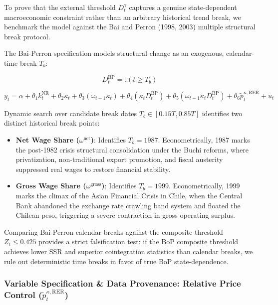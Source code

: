 To prove that the external threshold $D_t^{\gamma}$ captures a genuine state-dependent macroeconomic constraint rather than an arbitrary historical trend break, we benchmark the model against the Bai and Perron (1998, 2003) multiple structural break protocol.

The Bai-Perron specification models structural change as an exogenous, calendar-time break $T_b$:

\begin{equation}
D_t^{\text{BP}} = \mathbb{I}(t \ge T_b)
\end{equation}

\begin{equation}
y_t = \alpha + \theta_1 k_t^{\text{NR}} + \theta_2 \kappa_t + \theta_3 (\omega_{t-1} \kappa_t) + \theta_4 (\kappa_t D_t^{\text{BP}}) + \theta_5 (\omega_{t-1} \kappa_t D_t^{\text{BP}}) + \theta_6 \tilde{p}_t^{\kappa, \text{RER}} + u_t
\end{equation}

Dynamic search over candidate break dates $T_b \in [0.15 T, 0.85 T]$ identifies two distinct historical break points:
\begin{itemize}
    \item \textbf{Net Wage Share ($\omega^{\text{net}}$)}: Identifies $T_b = 1987$. Econometrically, 1987 marks the post-1982 crisis structural consolidation under the Buchi reforms, where privatization, non-traditional export promotion, and fiscal austerity suppressed real wages to restore financial stability.
    \item \textbf{Gross Wage Share ($\omega^{\text{gross}}$)}: Identifies $T_b = 1999$. Econometrically, 1999 marks the climax of the Asian Financial Crisis in Chile, when the Central Bank abandoned the exchange rate crawling band system and floated the Chilean peso, triggering a severe contraction in gross operating surplus.
\end{itemize}

Comparing Bai-Perron calendar breaks against the composite threshold $Z_t \le 0.425$ provides a strict falsification test: if the BoP composite threshold achieves lower SSR and superior cointegration statistics than calendar breaks, we rule out deterministic time breaks in favor of true BoP state-dependence.

\subsubsection{Variable Specification \& Data Provenance: Relative Price Control ($\tilde{p}_t^{\kappa, \text{RER}}$)}

